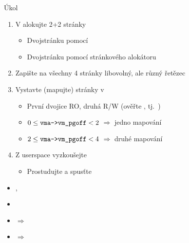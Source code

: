 \begin{frame}{Úkol}

  \begin{enumerate}
    \item V  alokujte 2+2 stránky
    \begin{itemize}
      \item Dvojstránku pomocí 
      \item Dvojstránku pomocí stránkového alokátoru
    \end{itemize}

    \item Zapište na všechny 4 stránky libovolný, ale různý řetězec

    \item Vystavte (mapujte) stránky v 
    \begin{itemize}
      \item První dvojice RO, druhá R/W (ověřte
        , tj.\ )
      \item $0 \leq \text{\code{vma->vm_pgoff}} < 2$ $\Rightarrow$ jedno
        mapování
      \item $2 \leq \text{\code{vma->vm_pgoff}} < 4$ $\Rightarrow$ druhé
        mapování
    \end{itemize}

    \item Z userspace vyzkoušejte
    \begin{itemize}
      \item Prostudujte a spusťte 
    \end{itemize}
  \end{enumerate}

  \medskip

  \begin{itemize}
    \item {}, 
    \item \footnotesize{}
    \item {} $\Rightarrow$ 
    \item {} $\Rightarrow$ 
  \end{itemize}

\end{frame}

\iffimuni
